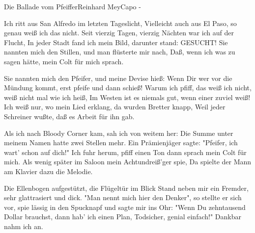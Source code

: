 \begin{song}{Die Ballade vom Pfeiffer}{Reinhard Mey}{Capo -}

Ich ritt aus San Alfredo im letzten Tageslicht,
Vielleicht auch aus El Paso, so genau weiß ich das nicht.
Seit vierzig Tagen, vierzig Nächten war ich auf der Flucht,
In jeder Stadt fand ich mein Bild, darunter stand: GESUCHT!
Sie nannten mich den Stillen, und man flüsterte mir nach,
Daß, wenn ich was zu sagen hätte, mein Colt für mich sprach.


Sie nannten mich den Pfeifer, und meine Devise hieß:
Wenn Dir wer vor die Mündung kommt, erst pfeife und dann schieß!
Warum ich pfiff, das weiß ich nicht, weiß nicht mal wie ich heiß,
Im Westen ist es niemals gut, wenn einer zuviel weiß!
Ich weiß nur, wo mein Lied erklang, da wurden Bretter knapp,
Weil jeder Schreiner wußte, daß es Arbeit für ihn gab.

Als ich nach Bloody Corner kam, sah ich von weitem her:
Die Summe unter meinem Namen hatte zwei Stellen mehr.
Ein Prämienjäger sagte: "Pfeifer, ich wart' schon auf dich!"
Ich fuhr herum, pfiff einen Ton dann sprach mein Colt für mich.
Als wenig später im Saloon mein Achtundreiß'ger spie,
Da spielte der Mann am Klavier dazu die Melodie.

Die Ellenbogen aufgestützt, die Flügeltür im Blick
Stand neben mir ein Fremder, sehr glattrasiert und dick.
"Man nennt mich hier den Denker", so stellte er sich vor,
spie lässig in den Spucknapf und sagte mir ins Ohr:
"Wenn Du zehntausend Dollar brauchst, dann hab' ich einen Plan,
Todsicher, genial einfach!" Dankbar nahm ich an.


\end{song}
